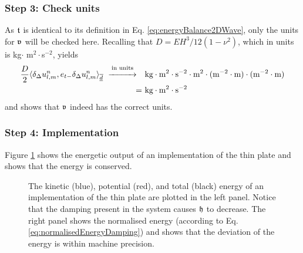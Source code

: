 {\subsubsection{Step 3: Check units}
As $\mathfrak{t}$ is identical to its definition in Eq. \eqref{eq:energyBalance2DWave}, only the units for $\mathfrak{v}$ will be checked here. Recalling that $D = EH^3 / 12(1-\nu^2)$, which in units is kg$\cdot$ m$^2\cdot$s$^{-2}$, yields
\begin{align*}
    \frac{D}{2}\langle\delta_{\Delta} u_{l,m}^n, e_{t-}\delta_{\Delta} u_{l,m}^n\rangle_{\overline{\underline{d}}} \
    \overset{\text{in units}}{\xrightarrow{\hspace*{1cm}}} \quad& \text{kg} \cdot \text{m}^2\cdot\text{s}^{-2}\cdot\text{m}^2\cdot(\text{m}^{-2}\cdot\text{m})\cdot(\text{m}^{-2}\cdot\text{m})\nonumber \\
    = \ &\text{kg}\cdot\text{m}^2\cdot\text{s}^{-2}
\end{align*}
and shows that $\mathfrak{v}$ indeed has the correct units. 

\subsubsection{Step 4: Implementation}
Figure \ref{fig:energyThinPlate} shows the energetic output of an implementation of the thin plate and shows that the energy is conserved.
\begin{figure}[h]
    \centering
      \caption{The kinetic (blue), potential (red), and total (black) energy of an implementation of the thin plate are plotted in the left panel. Notice that the damping present in the system causes $\mathfrak{h}$ to decrease. The right panel shows the normalised energy (according to Eq. \eqref{eq:normalisedEnergyDamping}) and shows that the deviation of the energy is within machine precision. \label{fig:energyThinPlate}}
\end{figure}

}
